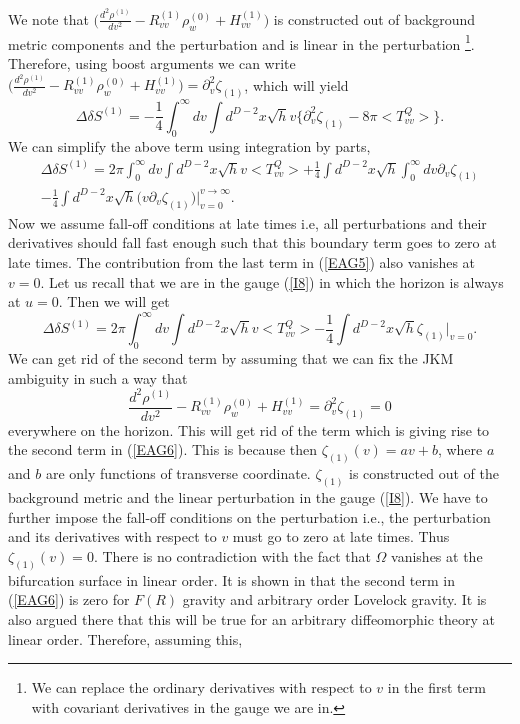 \documentclass[12pt]{article}
\begin{document}
We note that $\Big(\frac{d^2 \rho^{(1)} }{dv^2} - R^{(1)}_{vv} \rho_{w}^{(0)} + H^{(1)}_{vv}\Big) $ is constructed out of background metric components and the perturbation and is linear in the perturbation \footnote{We can replace the ordinary derivatives with respect to $v$ in the first term with covariant derivatives in the gauge we are in.}. Therefore, using boost arguments we can write $\Big(\frac{d^2 \rho^{(1)} }{dv^2} - R^{(1)}_{vv} \rho_{w}^{(0)} + H^{(1)}_{vv}\Big)= \partial^{2}_{v} \zeta_{(1)} $, which will yield
\begin{equation}\label{EAG4}
 \Delta \delta S^{(1)}= -\frac{1}{4}\int_{0}^{\infty} dv \int  d^{D-2}x \sqrt{h} v \Big\{ \partial^{2}_{v} \zeta_{(1)} -8\pi<T^{Q}_{vv}>  \Big\}.
\end{equation}
We can simplify the above term using integration by parts,
\begin{multline}\label{EAG5}
 \Delta \delta S^{(1)}= 2\pi \int_{0}^{\infty} dv \int  d^{D-2}x \sqrt{h} v <T^{Q}_{vv}> +\frac{1}{4}\int   d^{D-2}x \sqrt{h} \int_{0}^{\infty} dv \partial_{v} \zeta_{(1)}\\ - \frac{1}{4}\int  d^{D-2}x \sqrt{h} \Big(v \partial_{v} \zeta_{(1)}\Big)\Big |_{v=0} ^{v\rightarrow \infty}.
\end{multline}
Now we assume fall-off conditions at late times i.e, all perturbations and their derivatives should fall fast enough such that this boundary term goes to zero at late times. The contribution from the last term in (\ref{EAG5}) also vanishes at $v=0$. Let us recall that we are in the gauge (\ref{I8}) in which the horizon is always at $u=0$. Then we will get
\begin{equation}\label{EAG6}
\Delta \delta S^{(1)}= 2\pi \int_{0}^{\infty} dv \int  d^{D-2}x \sqrt{h} v <T^{Q}_{vv}>  - \frac{1}{4}\int   d^{D-2}x \sqrt{h}  \zeta_{(1)}\Big |_{v=0}.
\end{equation}
We can get rid of the second term by assuming that we can fix the JKM ambiguity in such a way that
\begin{equation}\label{EAG7}
\frac{d^2 \rho^{(1)} }{dv^2} - R^{(1)}_{vv} \rho_{w}^{(0)} + H^{(1)}_{vv}= \partial^2 _{v} \zeta_{(1)} =0
\end{equation}
  everywhere on the horizon. This will get rid of the term which is giving rise to the second term in (\ref{EAG6}). This is because then $\zeta_{(1)}(v)= a v + b$, where $a$ and $b$ are only functions of transverse coordinate. $\zeta_{(1)}$ is constructed out of the background metric and the linear perturbation in the gauge (\ref{I8}). We have to further impose the fall-off conditions on the perturbation i.e., the perturbation and its derivatives with respect to $v$ must go to zero at late times. Thus $\zeta_{(1)}(v)=0$. There is no contradiction with the fact that $\Omega$ vanishes at the bifurcation surface in linear order. It is shown in \cite{ASAS} that the second term in (\ref{EAG6}) is zero for $F(R)$ gravity and arbitrary order Lovelock gravity. It is also argued there that this will be true for an arbitrary diffeomorphic theory at linear order. Therefore, assuming this,
\end{document}
